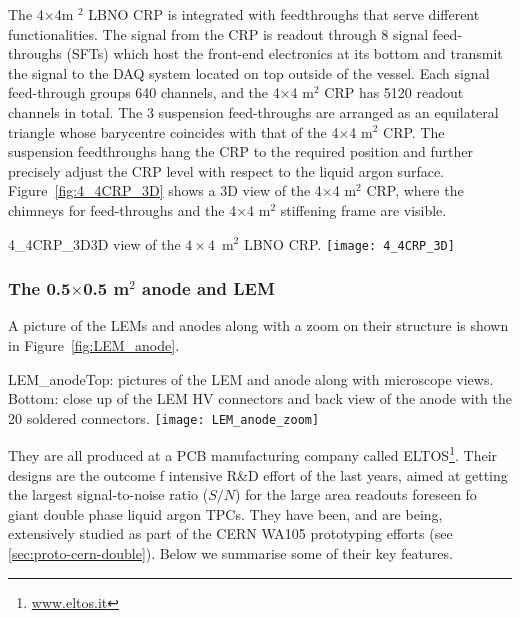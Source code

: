 The 4$\times$4m $^2$ LBNO CRP is integrated with feedthroughs that serve  different functionalities. The signal from the CRP is readout
through 8 signal feed-throughs (SFTs) which host the front-end electronics at its bottom and transmit the signal to the DAQ system
located on top outside of the vessel.  Each signal feed-through groups 640 channels, and the 4$\times$4 m$^2$ CRP has 5120 readout
channels in total.  The 3 suspension feed-throughs are arranged as an equilateral triangle whose barycentre coincides with that of the 4$\times$4 m$^2$ CRP.  The suspension feedthroughs hang the CRP to   the required position and further precisely adjust the CRP level  with respect to the liquid argon
surface. Figure~\ref{fig:4_4CRP_3D} shows a 3D view of the  4$\times$4 m$^2$ CRP, where the chimneys for feed-throughs and the  4$\times$4 m$^2$ stiffening frame are visible.
 

\begin{cdrfigure}{4_4CRP_3D}{3D view of the $4\times4$~m$^2$ LBNO CRP.}
\texttt{[image: 4\_4CRP\_3D]}  
\end{cdrfigure}


 \subsubsection{The 0.5$\times$0.5 m$^2$ anode and LEM}
 A picture of the LEMs and anodes along with a zoom on
 their structure is shown in Figure~\ref{fig:LEM_anode}.


\begin{cdrfigure}{LEM_anode}{Top: pictures of the LEM and anode along with microscope
  views. Bottom: close up of the LEM HV connectors and back view of the anode with the 20 soldered connectors.}
 \texttt{[image: LEM\_anode\_zoom]}  
 \end{cdrfigure}

 They are all produced at a PCB manufacturing company called  ELTOS\footnote{\url{www.eltos.it}}. Their designs are the outcome
  f intensive R\&D effort of the last years, aimed at getting the   largest signal-to-noise ratio ($S/N$) for the large area readouts
 foreseen fo giant double phase liquid argon TPCs. They have been,  and are being, extensively studied as part of the CERN WA105
 prototyping efforts (see \ref{sec:proto-cern-double}). Below we summarise  some of their key features.

